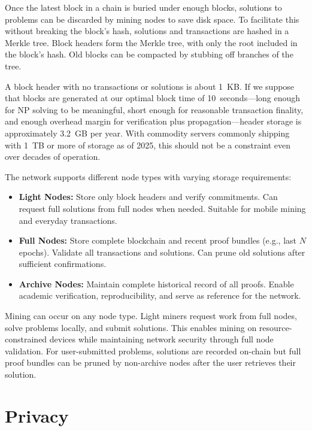 \documentclass[12pt,letterpaper]{article}
\begin{document}
Once the latest block in a chain is buried under enough blocks, solutions to problems can be discarded by
mining nodes to save disk space. To facilitate this without breaking the block's hash, solutions and
transactions are hashed in a Merkle tree. Block headers form the Merkle tree, with only the root included
in the block's hash. Old blocks can be compacted by stubbing off branches of the tree.

A block header with no transactions or solutions is about 1~KB. If we suppose that blocks are generated
at our optimal block time of 10~seconds---long enough for NP solving to be meaningful, short enough for
reasonable transaction finality, and enough overhead margin for verification plus propagation---header
storage is approximately 3.2~GB per year. With commodity servers commonly shipping with 1~TB or
more of storage as of 2025, this should not be a constraint even over decades of operation.

The network supports different node types with varying storage requirements:

\begin{itemize}[leftmargin=2em,itemsep=2pt]
  \item \textbf{Light Nodes:} Store only block headers and verify commitments. Can request full solutions
    from full nodes when needed. Suitable for mobile mining and everyday transactions.
  \item \textbf{Full Nodes:} Store complete blockchain and recent proof bundles (e.g., last $N$ epochs).
    Validate all transactions and solutions. Can prune old solutions after sufficient confirmations.
  \item \textbf{Archive Nodes:} Maintain complete historical record of all proofs. Enable academic
    verification, reproducibility, and serve as reference for the network.
\end{itemize}

Mining can occur on any node type. Light miners request work from full nodes, solve problems locally,
and submit solutions. This enables mining on resource-constrained devices while maintaining network
security through full node validation. For user-submitted problems, solutions are recorded on-chain but
full proof bundles can be pruned by non-archive nodes after the user retrieves their solution.

\section*{Privacy}
\end{document}
